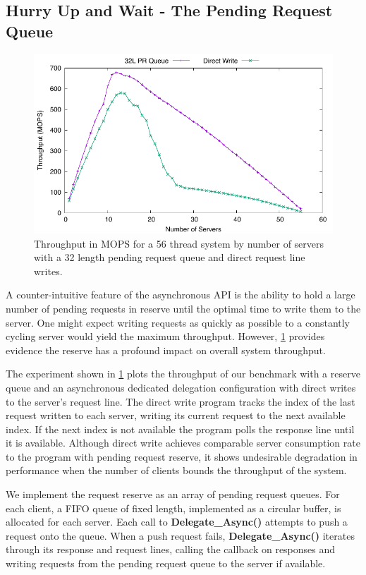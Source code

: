 \documentclass{uicthesi}
\begin{document}
\subsection{Hurry Up and Wait - The Pending Request Queue} \label{pr}
\begin{figure}[ht!]
\centering
\includegraphics[width=0.9\columnwidth]{FIG/queue_v_no_queue.pdf}
\caption{Throughput in MOPS for a 56 thread system by number of servers with a 32 length pending request queue and direct request line writes.}
\label{fig:queue_v_no_queue}
\end{figure}

A counter-intuitive feature of the asynchronous API is the ability to hold a large number of pending requests in reserve until the optimal time to write them to the server. One might expect writing requests as quickly as possible to a constantly cycling server would yield the maximum throughput. However, \ref{fig:queue_v_no_queue} provides evidence the reserve has a profound impact on overall system throughput. 

The experiment shown in \ref{fig:queue_v_no_queue} plots the throughput of our benchmark with a reserve queue and an asynchronous dedicated delegation configuration with direct writes to the server's request line. The direct write program tracks the index of the last request written to each server, writing its current request to the next available index. If the next index is not available the program polls the response line until it is available. Although direct write achieves comparable server consumption rate to the program with pending request reserve, it shows undesirable degradation in performance when the number of clients bounds the throughput of the system. 

We implement the request reserve as an array of pending request queues. For each client, a FIFO queue of fixed length, implemented as a circular buffer, is allocated for each server. Each call to \textbf{Delegate\_Async()} attempts to push a request onto the queue. When a push request fails, \textbf{Delegate\_Async()} iterates through its response and request lines, calling the callback on responses and writing requests from the pending request queue to the server if available. 
\end{document}
